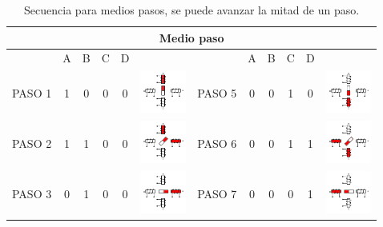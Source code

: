 \begin{table}
	\centering
	\caption{Secuencia para medios pasos, se puede avanzar la mitad de un paso. \cite{BasicStepper}}
	\label{tabla:medioPaso}
	\begin{tabular}{|c|c|c|c|c|c|c|c|c|c|c|c|}
		\hline 
		\multicolumn{12}{|c|}{Medio paso} \\ 
		\hline 
		& \hspace{1mm} A \hspace{1mm} & \hspace{1mm} B \hspace{1mm} & \hspace{1mm} C \hspace{1mm} & \hspace{1mm} D \hspace{1mm} & & & \hspace{1mm} A \hspace{1mm} & \hspace{1mm} B \hspace{1mm} & \hspace{1mm} C \hspace{1mm} & \hspace{1mm} D \hspace{1mm} &  \\ 
		\hline 
		PASO 1 & 1 & 0 & 0 & 0 & \includegraphics[width=15mm]{Imagenes/2/paso1} & PASO 5 & 0 & 0 & 1 & 0 & \includegraphics[width=15mm]{Imagenes/2/paso3} \\ 
		\hline 
		PASO 2 & 1 & 1 & 0 & 0 & \includegraphics[width=15mm]{Imagenes/2/paso1_5} & PASO 6 & 0 & 0 & 1 & 1 & \includegraphics[width=15mm]{Imagenes/2/paso3_5} \\ 
		\hline 
		PASO 3 & 0 & 1 & 0 & 0 & \includegraphics[width=15mm]{Imagenes/2/paso2} & PASO 7 & 0 & 0 & 0 & 1 & \includegraphics[width=15mm]{Imagenes/2/paso4} \\ 

\end{tabular}
\end{table}
